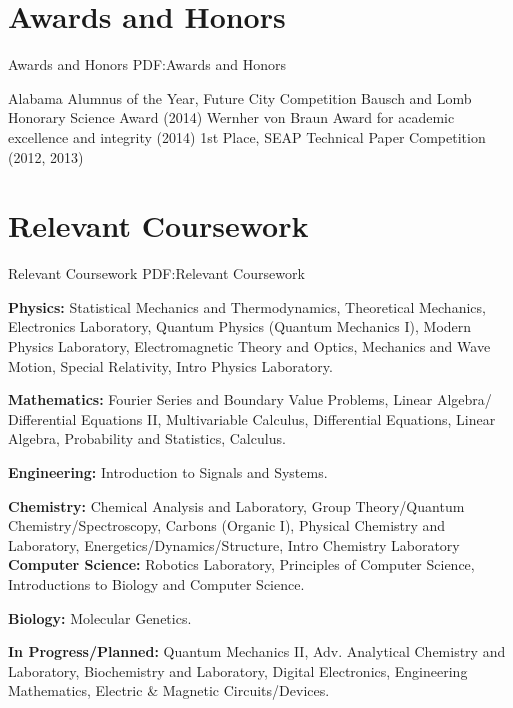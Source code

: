 \documentclass[letterpaper,10pt,oneside]{article}
\begin{document}
\begin{body}

\section
{Awards and Honors}
{Awards and Honors}
{PDF:Awards and Honors}

 Alabama Alumnus of the Year, Future City Competition 
\BulletItem
Bausch and Lomb Honorary Science Award (2014) 
\BulletItem
Wernher von Braun Award for academic excellence and integrity (2014)
\BulletItem 
1st Place, SEAP Technical Paper Competition (2012, 2013)


\section
{Relevant Coursework}
{Relevant Coursework}
{PDF:Relevant Coursework}

{\textbf{Physics:}}
Statistical Mechanics and Thermodynamics,
Theoretical Mechanics,
Electronics Laboratory,
Quantum Physics (Quantum Mechanics I),
Modern Physics Laboratory,
Electromagnetic Theory and Optics,
Mechanics and Wave Motion,
Special Relativity,
Intro Physics Laboratory.

\Gap
{\textbf{Mathematics:}}
Fourier Series and Boundary Value Problems,
Linear Algebra/ Differential Equations II,
Multivariable Calculus,
Differential Equations,
Linear Algebra,
Probability and Statistics,
Calculus.

\Gap
{\textbf{Engineering:}}
Introduction to Signals and Systems.

\Gap
{\textbf{Chemistry:}}
Chemical Analysis and Laboratory,
Group Theory/Quantum Chemistry/Spectroscopy,
Carbons (Organic I),
Physical Chemistry and Laboratory,
Energetics/Dynamics/Structure,
Intro Chemistry Laboratory \\

\Gap
{\textbf{Computer Science:}}
Robotics Laboratory,
Principles of Computer Science,
Introductions to Biology and Computer Science.

\Gap
{\textbf{Biology:}}
Molecular Genetics.

\Gap
{\textbf{In Progress/Planned:}}
Quantum Mechanics II,
Adv. Analytical Chemistry and Laboratory,
Biochemistry and Laboratory,
Digital Electronics,
Engineering Mathematics,
Electric \& Magnetic Circuits/Devices.


\end{body}
\end{document}
